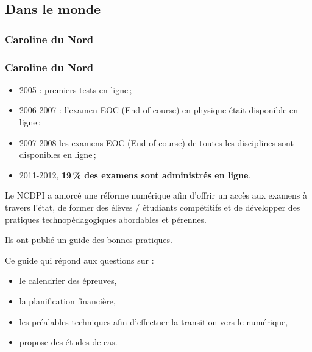 \documentclass{beamer}
\begin{document}
		
		
		\subsection{Dans le monde} 
						
			\subsubsection{Caroline du Nord} 
				\begin{frame}[allowframebreaks]
					  \frametitle{Caroline du Nord \citep{NorthCarolina2013}}
				 	\begin {itemize}
						\item 2005 : premiers tests en ligne\,;
						\item 2006-2007 :  l'examen EOC  (End-of-course) en physique était disponible en ligne\,;
						\item 2007-2008 les examens EOC  (End-of-course) de toutes les disciplines sont disponibles en ligne\,;
						\item 2011-2012, \textbf{19\,\% des examens sont administrés en ligne}.
					\end{itemize}
					\par Le NCDPI a amorcé une réforme numérique afin d'offrir un accès aux examens à travers l'état, de former des élèves / étudiants compétitifs et de développer des pratiques technopédagogiques abordables et pérennes. 
					\par Ils ont publié un guide des bonnes pratiques.
					\framebreak
					\par Ce guide qui répond aux questions sur :
					\begin {itemize}
						\item le calendrier des épreuves,
						\item la planification financière,
						\item les préalables techniques afin d'effectuer la transition vers le numérique,
						\item propose des études de cas.
						
					\end{itemize}
					\par 
				\end{frame}
		
		
\end{document}
